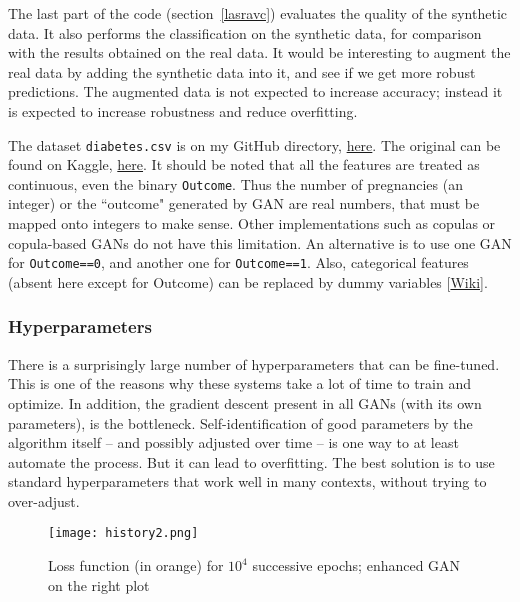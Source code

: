 \documentclass[oneside,10pt]{book}
\begin{document}
The last part of the code (section~\ref{lasravc}) evaluates the quality of the synthetic data. It also performs the classification on the synthetic data, for comparison with the results obtained 
on the real data. It would be interesting to augment the real data by adding the synthetic data into it, and see if we get more robust predictions. 
The augmented data is not expected to increase accuracy; instead it is expected to increase robustness and reduce  \textcolor{index}{overfitting}.

The dataset \texttt{diabetes.csv} is on my GitHub directory, \href{https://github.com/VincentGranville/Main/blob/main/diabetes.csv}{here}. 
The original can be found on Kaggle, \href{https://www.kaggle.com/uciml/pima-indians-diabetes-database}{here}. It should be
noted that all the features are treated as continuous, even the binary \texttt{Outcome}. Thus the number of pregnancies (an integer) or the ``outcome" generated by GAN
 are real numbers, that must be mapped onto integers to make sense. Other implementations such as copulas or copula-based GANs do not have
 this limitation. An alternative is to use one GAN for \texttt{Outcome==0}, and another one for \texttt{Outcome==1}. Also, categorical features (absent here except for Outcome) can be replaced
 by \textcolor{index}{dummy variables} [\href{https://en.wikipedia.org/wiki/Dummy_variable_(statistics)}{Wiki}]. 
 

\subsubsection{Hyperparameters}\label{fgdloo}

There is a surprisingly large number of hyperparameters that can be fine-tuned. This is one of the reasons why these systems take a lot of time
 to train and optimize. In addition, the gradient descent present in all GANs (with its own parameters), is the bottleneck. Self-identification of good parameters by the algorithm
 itself -- and possibly adjusted over time --  is one way to at least automate the process. But it can lead to overfitting. The best
 solution is to use standard hyperparameters that work well in many contexts, without trying to over-adjust. 

\begin{figure}[H]
\centering
\texttt{[image: history2.png]}  
\caption{Loss function (in orange) for $10^4$ successive epochs; enhanced GAN on the right plot}
\label{fig:pictty2xsvv}
\end{figure}
\end{document}
